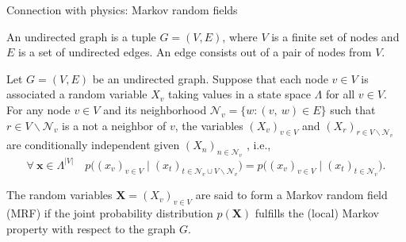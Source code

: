 \documentclass[8pt]{beamer}
\begin{document}
\begin{frame}[label={sec:org622b21e}]{Connection with physics: Markov random fields}
\begin{definition}
An undirected graph is a tuple \(G=(V, E)\), where \(V\) is a finite set of nodes and \(E\) is a set of undirected edges. An edge consists out of a pair of nodes from \(V\).
\hfill \blacksquare
\label{orgf63e7b3}
\end{definition}
\linebreak
\begin{definition}
Let \(G=(V, E)\) be an undirected graph. Suppose that each node \(v \in V\) is associated a random variable \(X_{v}\) taking values in a state space \(\Lambda\) for  all \(v \in V\). For any node \(v \in V\) and its neighborhood \(\mathcal{N}_{v} = \{w : (v, ~ w) \in E\}\) such that \(r \in V \backslash \mathcal{N}_{v}\) is a not a neighbor of \(v\), the variables \((X_{v})_{v \in V}\) and \((X_{r})_{r \in V\backslash \mathcal{N}_{v}}\) are conditionally independent given \((X_{n})_{n \in \mathcal{N}_{v}}\) \cite{fischer2012introduction}, i.e.,
\[
\forall~\boldsymbol{x} \in \Lambda^{\lvert V \rvert} \quad p \big((x_{v})_{v \in V} \mid (x_{t})_{t \in \mathcal{N}_{v} \cup V \backslash \mathcal{N}_{v}} \big) = p \big((x_{v})_{v \in V} \mid\left(x_{t}\right)_{t \in \mathcal{N}_{v}}\big).
\]
\hfill \blacksquare
\label{orgc0963b4}
\end{definition}
\linebreak
\begin{definition}
The random variables \(\boldsymbol{X}=\left(X_{v}\right)_{v \in V}\) are said to form a Markov random field (MRF) if the joint probability distribution \(p (\boldsymbol{X})\) fulfills the (local) Markov property with respect to the graph \(G\). \cite{fischer2012introduction}
\hfill \blacksquare
\label{org2322992}
\end{definition}
\end{frame}
\end{document}
